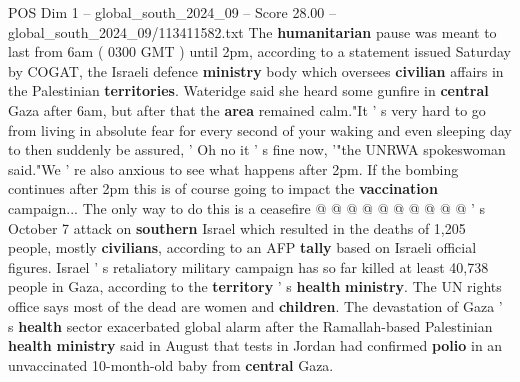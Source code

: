 \begin{textsample}{POS Dim 1 – global\_south\_2024\_09 – Score 28.00 – global\_south\_2024\_09/113411582.txt}
The \textbf{humanitarian} pause was meant to last from 6am ( 0300 GMT ) until 2pm, according to a statement issued Saturday by COGAT, the Israeli defence \textbf{ministry} body which oversees \textbf{civilian} affairs in the Palestinian \textbf{territories}.
Wateridge said she heard some gunfire in \textbf{central} Gaza after 6am, but after that the \textbf{area} remained calm."It ' s very hard to go from living in absolute fear for every second of your waking and even sleeping day to then suddenly be assured, ' Oh no it ' s fine now, '"the UNRWA spokeswoman said."We ' re also anxious to see what happens after 2pm.
If the bombing continues after 2pm this is of course going to impact the \textbf{vaccination} campaign...
The only way to do this is a ceasefire @ @ @ @ @ @ @ @ @ @ ' s October 7 attack on \textbf{southern} Israel which resulted in the deaths of 1,205 people, mostly \textbf{civilians}, according to an AFP \textbf{tally} based on Israeli official figures.
Israel ' s retaliatory military campaign has so far killed at least 40,738 people in Gaza, according to the \textbf{territory} ' s \textbf{health} \textbf{ministry}.
The UN rights office says most of the dead are women and \textbf{children}.
The devastation of Gaza ' s \textbf{health} sector exacerbated global alarm after the Ramallah-based Palestinian \textbf{health} \textbf{ministry} said in August that tests in Jordan had confirmed \textbf{polio} in an unvaccinated 10-month-old baby from \textbf{central} Gaza.

\end{textsample}
